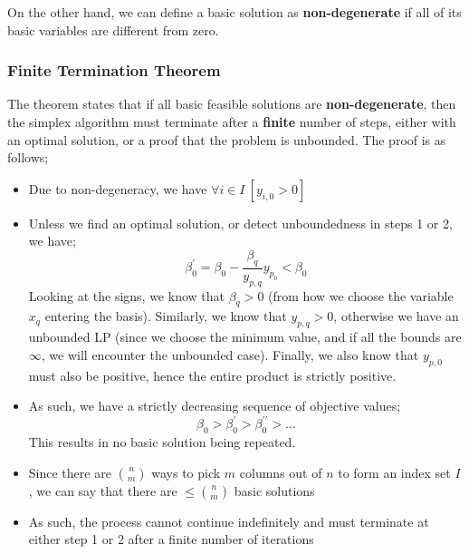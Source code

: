 \documentclass[a4paper, 12pt]{article}
\begin{document}
                On the other hand, we can define a basic solution as \textbf{non-degenerate} if all of its basic variables are different from zero.
            \subsubsection*{Finite Termination Theorem}
                The theorem states that if all basic feasible solutions are \textbf{non-degenerate}, then the simplex algorithm must terminate after a \textbf{finite} number of steps, either with an optimal solution, or a proof that the problem is unbounded.
                The proof is as follows;
                \begin{itemize}
                    \itemsep0em
                    \item Due to non-degeneracy, we have $\forall i \in I\ [y_{i, 0} > 0]$
                    \item Unless we find an optimal solution, or detect unboundedness in steps 1 or 2, we have;
                        $$\beta^\prime_0 = \beta_0 - \frac{\beta_q}{y_{p, q}}y_{p_0} < \beta_0$$
                        Looking at the signs, we know that $\beta_q > 0$ (from how we choose the variable $x_q$ entering the basis).
                        Similarly, we know that $y_{p, q} > 0$, otherwise we have an unbounded LP (since we choose the minimum value, and if all the bounds are $\infty$, we will encounter the unbounded case).
                        Finally, we also know that $y_{p, 0}$ must also be positive, hence the entire product is strictly positive.
                    \item As such, we have a strictly decreasing sequence of objective values;
                        $$\beta_0 > \beta^\prime_0 > \beta^{\prime\prime}_0 > \dots$$
                        This results in no basic solution being repeated.
                    \item Since there are $\binom{n}{m}$ ways to pick $m$ columns out of $n$ to form an index set $I$, we can say that there are $\leq \binom{n}{m}$ basic solutions
                    \item As such, the process cannot continue indefinitely and must terminate at either step 1 or 2 after a finite number of iterations
                \end{itemize}
\end{document}
